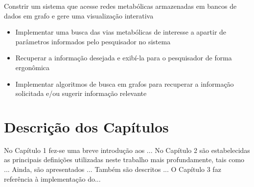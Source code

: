 \indent 
Constrir um sistema que acesse redes metabólicas armazenadas em bancos de dados em grafo e gere uma visualização interativa
\begin{itemize}
 \item Implementar uma busca das vias metabólicas de interesse a apartir de parâmetros informados pelo pesquisador no sistema
 \item Recuperar a informação desejada e exibí-la para o pesquisador de forma ergonômica
 \item Implementar algoritmos de busca em grafos para recuperar a informação solicitada e/ou sugerir informação relevante
\end{itemize}

\section{Descrição dos Capítulos}

\indent No Capítulo 1 fez-se uma breve introdução aos ... No Capítulo 2 são estabelecidas as principais definições utilizadas neste trabalho mais profundamente, tais 
como ... Ainda, são apresentados ... Também são descritos ... O Capítulo 3 faz referência à implementação do... 






